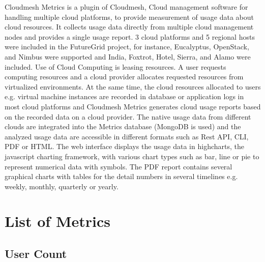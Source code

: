 \documentclass{sig-alternate}
\begin{document}
Cloudmesh Metrics is a plugin of Cloudmesh, Cloud management software for handling multiple cloud platforms, to provide measurement of usage data about cloud resources. It collects usage data directly from multiple cloud management nodes and provides a single usage report. 3 cloud platforms and 5 regional hosts were included in the FutureGrid project, for instance, Eucalyptus, OpenStack, and Nimbus were supported and India, Foxtrot, Hotel, Sierra, and Alamo were included. Use of Cloud Computing is leasing resources. A user requests computing resources and a cloud provider allocates requested resources from virtualized environments. At the same time, the cloud resources allocated to users e.g. virtual machine instances are recorded in database or application logs in most cloud platforms and Cloudmesh Metrics generates cloud usage reports based on the recorded data on a cloud provider. The native usage data from different clouds are integrated into the Metrics database (MongoDB is used) and the analyzed usage data are accessible in different formats such as Rest API, CLI, PDF or HTML. The web interface displays the usage data in highcharts, the javascript charting framework, with various chart types such as bar, line or pie to represent numerical data with symbols. The PDF report contains several graphical charts with tables for the detail numbers in several timelines e.g. weekly, monthly, quarterly or yearly. 


\section{List of Metrics}
\subsection{User Count}
\end{document}
